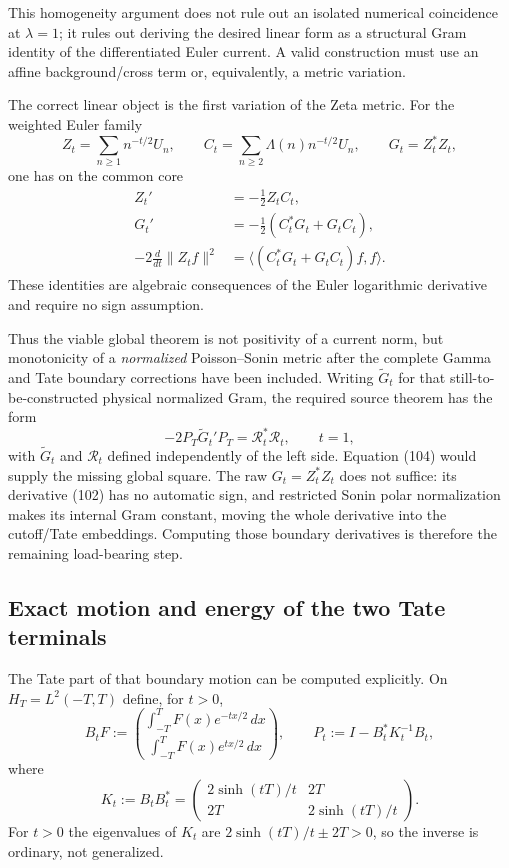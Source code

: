 \documentclass[11pt]{article}
\begin{document}
This homogeneity argument does not rule out an isolated numerical coincidence
at $\lambda=1$; it rules out deriving the desired linear form as a structural
Gram identity of the differentiated Euler current.  A valid construction
must use an affine background/cross term or, equivalently, a metric variation.

The correct linear object is the first variation of the Zeta metric.  For
the weighted Euler family
\[
 Z_t=\sum_{n\ge1}n^{-t/2}U_n,\qquad
 C_t=\sum_{n\ge2}\Lambda(n)n^{-t/2}U_n,\qquad
 G_t=Z_t^*Z_t,
\]
one has on the common core
\begin{align}
 Z_t'&=-\frac12Z_tC_t,                                 \tag{101}\\
 G_t'&=-\frac12(C_t^*G_t+G_tC_t),                     \tag{102}\\
 -2\frac d{dt}\|Z_tf\|^2
 &=\langle(C_t^*G_t+G_tC_t)f,f\rangle.                \tag{103}
\end{align}
These identities are algebraic consequences of the Euler logarithmic
derivative and require no sign assumption.

Thus the viable global theorem is not positivity of a current norm, but
monotonicity of a \emph{normalized} Poisson--Sonin metric after the complete
Gamma and Tate boundary corrections have been included.  Writing
$\widetilde G_t$ for that still-to-be-constructed physical normalized Gram,
the required source theorem has the form
\begin{equation}
 -2P_T\widetilde G_t'P_T
 =\mathcal R_t^*\mathcal R_t,
 \qquad t=1,                                           \tag{104}
\end{equation}
with $\widetilde G_t$ and $\mathcal R_t$ defined independently of the left
side.  Equation (104) would supply the missing global square.  The raw
$G_t=Z_t^*Z_t$ does not suffice: its derivative (102) has no automatic sign,
and restricted Sonin polar normalization makes its internal Gram constant,
moving the whole derivative into the cutoff/Tate embeddings.  Computing
those boundary derivatives is therefore the remaining load-bearing step.

\subsection{Exact motion and energy of the two Tate terminals}

The Tate part of that boundary motion can be computed explicitly.  On
$H_T=L^2(-T,T)$ define, for $t>0$,
\begin{equation}
 B_tF:=\binom{\displaystyle\int_{-T}^TF(x)e^{-tx/2}\,dx}
                 {\displaystyle\int_{-T}^TF(x)e^{tx/2}\,dx},
 \qquad P_t:=I-B_t^*K_t^{-1}B_t,                       \tag{105}
\end{equation}
where
\begin{equation}
 K_t:=B_tB_t^*
 =\begin{pmatrix}
 2\sinh(tT)/t&2T\\2T&2\sinh(tT)/t
 \end{pmatrix}.                                       \tag{106}
\end{equation}
For $t>0$ the eigenvalues of $K_t$ are
$2\sinh(tT)/t\pm2T>0$, so the inverse is ordinary, not generalized.
\end{document}

